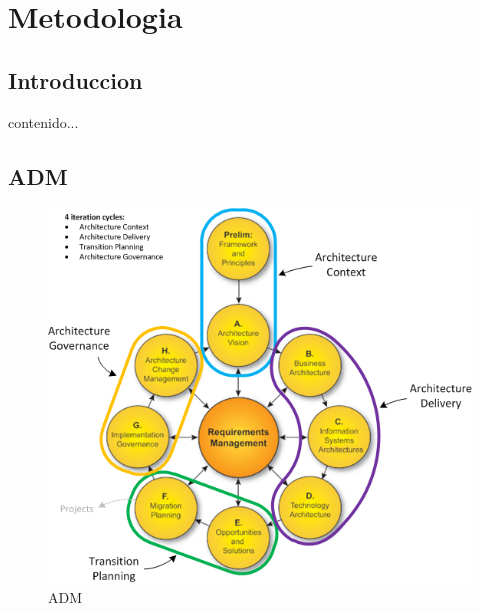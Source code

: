 \chapter{Metodologia}
\section{Introduccion}
contenido...

\newpage
\section{ADM}
\begin{figure}[h!]
	\centering
	\includegraphics[width=1\linewidth]{imgs/adm.png}
	\caption{ADM \cite{archi3.1,a1,a2,a3,a4}}
\end{figure}
